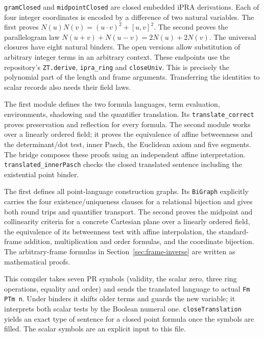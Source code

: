 \begin{description}[leftmargin=0pt,labelsep=0pt,labelwidth=0pt,style=nextline]
\item[\texttt{MetricIdentities.lean}.]
\texttt{gramClosed} and \texttt{midpointClosed} are closed embedded
iPRA derivations. Each of four integer coordinates is encoded by a
difference of two natural variables. The first proves
$N(u)N(v)=(u\cdot v)^2+[u,v]^2$. The second proves the parallelogram law
$N(u+v)+N(u-v)=2N(u)+2N(v)$. The universal closures have eight
natural binders. The open versions allow substitution of arbitrary
integer terms in an arbitrary context. These endpoints use the repository's
\texttt{ZT.derive}, \texttt{ipra\_ring} and \texttt{closeUniv}.
This is precisely the polynomial part of the length and frame arguments.
Transferring the identities to scalar records also needs their field laws.
\item[\texttt{Translation.lean}, \texttt{Axioms.lean} and \texttt{Bridge.lean}.]
The first module defines the two formula languages, term evaluation,
environments, shadowing and the quantifier translation. Its
\texttt{translate\_correct} proves preservation and reflection for every
formula. The second module works over a linearly ordered field; it
proves the equivalence of affine betweenness and the determinant/dot
test, inner Pasch, the Euclidean axiom and five segments. The bridge
composes these proofs using an independent affine interpretation.
\texttt{translated\_innerPasch} checks the closed translated sentence
including the existential point binder.
\item[\texttt{FrameRelations.lean} and \texttt{CanonicalFrame.lean}.]
The first defines all point-language construction graphs. Its
\texttt{BiGraph} explicitly carries the four existence/uniqueness clauses
for a relational bijection and gives both round trips and quantifier
transport. The second proves the midpoint and collinearity criteria for
a concrete Cartesian plane over a linearly ordered field, the equivalence
of its betweenness test with affine interpolation, the standard-frame
addition, multiplication and order formulas, and the coordinate bijection.
The arbitrary-frame formulas in Section~\ref{sec:frame-inverse} are written
as mathematical proofs.
\item[\texttt{ObjectLanguage.lean}.]
This compiler takes seven PR symbols (validity, the scalar zero, three
ring operations, equality and order) and sends the translated language
to actual \texttt{Fm PTm n}. Under binders it shifts older terms and
guards the new variable; it interprets both scalar tests by the Boolean
numeral one. \texttt{closeTranslation} yields an exact type of sentence
for a closed point formula once the symbols are filled. The scalar symbols
are an explicit input to this file.
\end{description}
